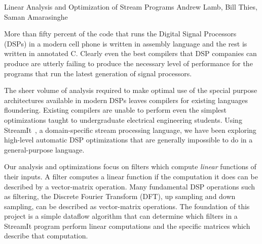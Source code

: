 

\formattitlecontents 
{Linear Analysis and Optimization of Stream Programs}
{Andrew Lamb, Bill Thies, Saman Amarasinghe}


%

More than fifty percent of the code that runs the Digital Signal Processors
(DSPs) in a modern cell phone is written in assembly language and the 
rest is written in annotated C\cite{gass-talk}. Clearly even the best 
compilers that DSP companies can produce are utterly failing to produce
the necessary level of performance for the programs that run the latest generation
of signal processors.

The sheer volume of analysis required to make optimal use of the special 
purpose architectures available in modern DSPs leaves compilers for existing languages 
floundering. Existing compilers are unable to perform even the simplest 
optimizations taught to undergraduate electrical engineering students. Using 
StreamIt~\cite{streamitcc}, 
a domain-specific stream processing language, we have been exploring
high-level automatic DSP optimizations that are generally impossible
to do in a general-purpose language.

Our analysis and optimizations focus on filters which compute {\it linear} 
functions of their inputs. A filter computes a linear function if
the computation it does can be described by a vector-matrix operation. 
Many fundamental DSP operations such as filtering, the Discrete Fourier 
Transform (DFT), up sampling and down sampling, can be described 
as vector-matrix operations. The foundation of this project is
a simple dataflow algorithm that can determine which filters in a 
StreamIt program perform linear computations and the specific matrices
which describe that computation.

